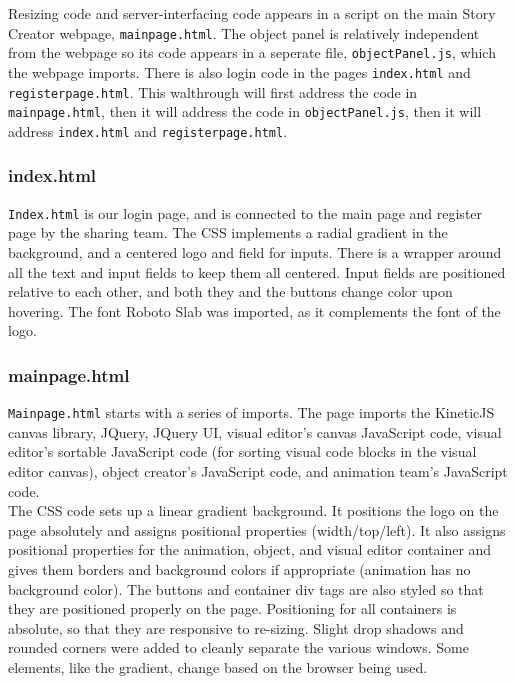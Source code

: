 \documentclass[12pt]{article}
\begin{document}
Resizing code and server-interfacing code appears in a script on the main Story Creator webpage, \texttt{mainpage.html}. The object panel is relatively independent from the webpage so its code appears in a seperate file, \texttt{objectPanel.js}, which the webpage imports. There is also login code in the pages \texttt{index.html} and \texttt{registerpage.html}. This walthrough will first address the code in \texttt{mainpage.html}, then it will address the code in \texttt{objectPanel.js}, then it will address \texttt{index.html} and \texttt{registerpage.html}. \\

\subsubsection{index.html}
\texttt{Index.html} is our login page, and is connected to the main page and register page by the sharing team. The CSS implements a radial gradient in the background, and a centered logo and field for inputs. There is a wrapper around all the text and input fields to keep them all centered. Input fields are positioned relative to each other, and both they and the buttons change color upon hovering. The font Roboto Slab was imported, as it complements the font of the logo.\\

\subsubsection{mainpage.html}
\texttt{Mainpage.html} starts with a series of imports. The page imports the KineticJS canvas library, JQuery, JQuery UI, visual editor's canvas JavaScript code, visual editor's sortable JavaScript code (for sorting visual code blocks in the visual editor canvas), object creator's JavaScript code, and animation team's JavaScript code. \\

The CSS code sets up a linear gradient background. It positions the logo on the page absolutely and assigns positional properties (width/top/left). It also assigns positional properties for the animation, object, and visual editor container and gives them borders and background colors if appropriate (animation has no background color). The buttons and container div tags are also styled so that they are positioned properly on the page. Positioning for all containers is absolute, so that they are responsive to re-sizing. Slight drop shadows and rounded corners were added to cleanly separate the various windows. Some elements, like the gradient, change based on the browser being used. \\
\end{document}
